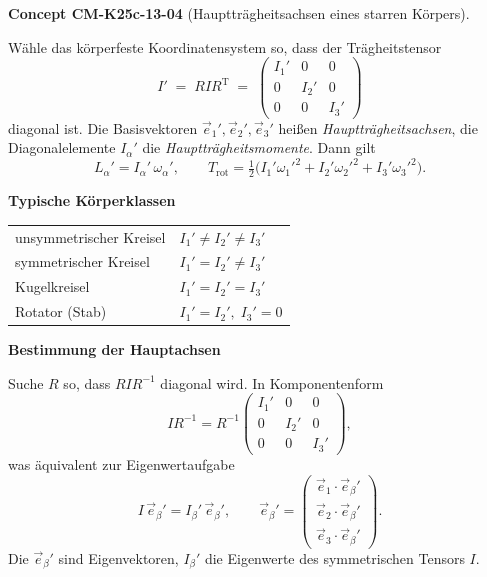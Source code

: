 \documentclass[10pt, letterpaper]{article}
\newcommand{\CustomHeading}[3]{%
  \par\medskip\noindent%
  \textbf{#1 #2} \textnormal{(#3)}.\enskip%
}
\newenvironment{CONC}[2]{\CustomHeading{Concept}{#1}{#2}}{}
\begin{document}
\begin{CONC}{CM-K25c-13-04}{Hauptträgheitsachsen eines starren Körpers}
Wähle das körperfeste Koordinatensystem so, dass der Trägheits­tensor
\[
  I' \;=\; R I R^{\mathrm T}
  \;=\;
  \begin{pmatrix}
    I_1' & 0 & 0 \\
    0 & I_2' & 0 \\
    0 & 0 & I_3'
  \end{pmatrix}
\]
diagonal ist.  
Die Basisvektoren $\vec e_1',\vec e_2',\vec e_3'$ heißen
\emph{Hauptträgheitsachsen},
die Diagonalelemente $I_\alpha'$ die
\emph{Hauptträgheitsmomente}.
Dann gilt
\[
  L_\alpha' = I_\alpha'\,\omega_\alpha',
  \qquad
  T_{\text{rot}}=\tfrac12
    \bigl(I_1'\omega_1'^{2}+I_2'\omega_2'^{2}+I_3'\omega_3'^{2}\bigr).
\]

\textbf{Typische Körperklassen}

\begin{tabular}{@{}ll@{}}
unsymmetrischer Kreisel & $I_1'\neq I_2'\neq I_3'$ \\[2pt]
symmetrischer Kreisel  & $I_1'=I_2'\neq I_3'$ \\[2pt]
Kugelkreisel           & $I_1'=I_2'=I_3'$ \\[2pt]
Rotator (Stab)         & $I_1'=I_2',\;I_3'=0$
\end{tabular}



\textbf{Bestimmung der Hauptachsen}

Suche $R$ so, dass $RIR^{-1}$ diagonal wird.
In Komponentenform
\[
  I R^{-1} = R^{-1}
  \begin{pmatrix}
    I_1' & 0 & 0 \\ 0 & I_2' & 0 \\ 0 & 0 & I_3'
  \end{pmatrix},
\]
was äquivalent zur Eigenwertaufgabe
\[
  I\,\vec e_\beta' = I_\beta'\,\vec e_\beta',
  \qquad
  \vec e_\beta' =
  \begin{pmatrix}
    \vec e_1\!\cdot\!\vec e_\beta'\\
    \vec e_2\!\cdot\!\vec e_\beta'\\
    \vec e_3\!\cdot\!\vec e_\beta'
  \end{pmatrix}.
\]
Die $\vec e_\beta'$ sind Eigen­vektoren, $I_\beta'$ die
Eigen­werte des symmetrischen Tensors $I$.
\end{CONC}
\end{document}
